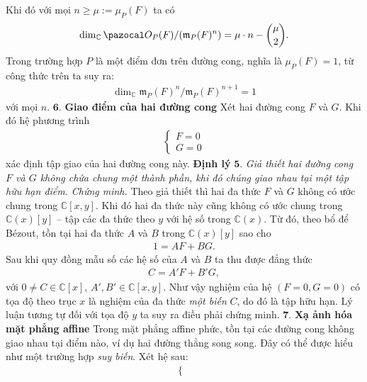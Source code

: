 \begin{multicols}{2}
{		Khi đó với mọi $n\geq\mu:= \mu_P(F)$  ta có}
		\setlength{\abovedisplayskip}{8pt}
		\setlength{\belowdisplayskip}{8pt} 
		\begin{align*}
			\dim_{\mathbb C}  \pazocal O_P(F)/(\mathfrak m_P(F)^n)=\mu \cdot n -
			{\mu \choose 2}.
		\end{align*}
	\vskip 0.1cm
	Trong trường hợp $P$ là một điểm đơn trên đường cong, nghĩa là $\mu_P(F)=1$, từ công thức trên ta suy ra:
	\begin{align*}
		\dim_{\mathbb C} \mathfrak m_P(F)^n/\mathfrak m_P(F)^{n+1}=1
	\end{align*}
	với mọi $n$. 
	\vskip 0.1cm
	$\pmb{6.}$ \textbf{\color{duongvaotoanhoc}Giao điểm của hai đường cong}
	\vskip 0.1cm
	Xét hai đường cong $F$  và $G$. Khi đó hệ phương trình
	\begin{align*}
		\begin{cases}
			F = 0\\
			G = 0
		\end{cases}
	\end{align*}
	xác định tập giao của hai đường cong này.  
	\vskip 0.1cm
	\textbf{\color{duongvaotoanhoc}Định lý} $\pmb{5.}$ \textit{Giả thiết hai đường cong $F$  và $G$  không chứa chung một thành phần, khi đó chúng giao nhau tại một tập hữu hạn điểm.}
	\vskip 0.1cm
	\textit{Chứng minh.}
	Theo giả thiết thì hai đa thức $F$ và $G$ không có ước chung trong $\mathbb C[x,y]$. Khi đó hai đa thức này cũng không có ước chung trong $\mathbb C(x)[y]$ -- tập các đa thức theo $y$ với hệ số trong $\mathbb C(x)$. Từ đó, theo bổ để B\'ezout, tồn tại hai đa thức $A$ và $B$ trong  $\mathbb C(x)[y]$ sao cho
	\begin{align*}
		1=AF+BG.
	\end{align*}
	Sau khi quy đồng mẫu số các hệ số của $A$ và $B$ ta thu được đẳng thức
	\begin{align*}
		C= A'F+ B'G,
	\end{align*}
	với $0\neq C\in\mathbb C[x]$, $ A', B'\in \mathbb C[x,y]$. 
	Như vậy nghiệm của hệ $(F=0, G=0)$ có tọa độ theo trục $x$ là nghiệm của đa thức {\em một biến} $C$, do đó là tập hữu hạn. Lý luận tương tự đối với tọa độ $y$ ta suy ra điều phải chứng minh. 
	\vskip 0.1cm
	$\pmb{7.}$ \textbf{\color{duongvaotoanhoc}Xạ ảnh hóa mặt phẳng affine} 
	\vskip 0.1cm
	Trong mặt phẳng affine phức, tồn tại các đường cong không giao nhau tại điểm nào, ví dụ hai đường thẳng song song. 
	Đây có thể được hiểu như một trường hợp {\em suy biến}. Xét hệ sau:
	\begin{align*}
		\begin{cases}

\end{cases}
\end{align*}
\end{multicols}
